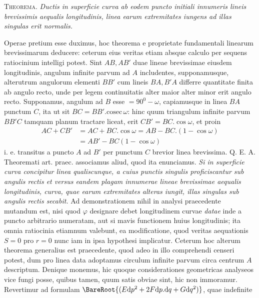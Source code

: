 \par\indent{}%
\textsc{Theorema.} \textit{Ductis in superficie curva ab eodem puncto initiali innumeris lineis brevissimis aequalis longitudinis, linea earum extremitates iungens ad illas singulas erit normalis.}

Operae pretium esse duximus, hoc theorema e proprietate fundamentali linearum brevissimarum deducere: ceterum eius veritas etiam absque calculo per sequens ratiocinium intelligi potest. Sint \(AB,AB'\) duae lineae brevissimae eiusdem longitudinis, angulum infinite parvum ad \(A\) includentes, supponamusque, alterutrum angulorum elementi \(BB'\) cum lineis \(BA,B'A\) differre quantitate finita ab angulo recto, unde per legem continuitatis alter maior alter minor erit angulo recto. Supponamus, angulum ad \(B\) esse \(=90^0-\omega\), capiamusque in linea \(BA\) punctum \(C\), ita ut sit \(BC=BB'\mathord{.}\mathrm{cosec}\,\omega\): hinc quum triangulum infinite parvum \(BB'C\) tamquam planum tractare liceat, erit \(CB'=BC\mathord{.}\cos\omega\), et proin
\[
\begin{aligned}
AC+CB'&=AC+BC\mathord{.}\cos\omega=AB-BC\mathord{.}(1-\cos\omega)\\
&=AB'-BC(1-\cos\omega)
\end{aligned}
\]
i. e. transitus a puncto \(A\) ad \(B'\) per punctum \(C\) brevior linea brevissima. Q. E. A.
Theoremati art. praec. associamus aliud, quod ita enunciamus. \textit{Si in superficie curva concipitur linea qualiscunque, a cuius punctis singulis proficiscantur sub angulis rectis et versus eandem plagam innumerae lineae brevissimae aequalis longitudinis, curva, quae earum extremitates alteras iungit, illas singulas sub angulis rectis secabit.} Ad demonstrationem nihil in analysi praecedente mutandum est, nisi quod \(\varphi\) designare debet longitudinem curvae \textit{datae} inde a puncto arbitrario numeratam, aut si mavis functionem huius longitudinis; ita omnia ratiocinia etiamnum valebunt, ea modificatione, quod veritas aequationis \(S=0\) pro \(r=0\) nunc iam in ipsa hypothesi implicatur. Ceterum hoc alterum theorema generalius est praecedente, quod adeo in illo comprehendi censeri potest, dum pro linea data adoptamus circulum infinite parvum circa centrum \(A\) descriptum. Denique monemus, hic quoque considerationes geometricas analyseos vice fungi posse, quibus tamen, quum satis obviae sint, hic non immoramur.
Revertimur ad formulam \(\BareRoot{(E\mathrm{d}p^2+2F\mathrm{d}p\mathord{.}\mathrm{d}q+G\mathrm{d}q^2)}\), quae indefinite
